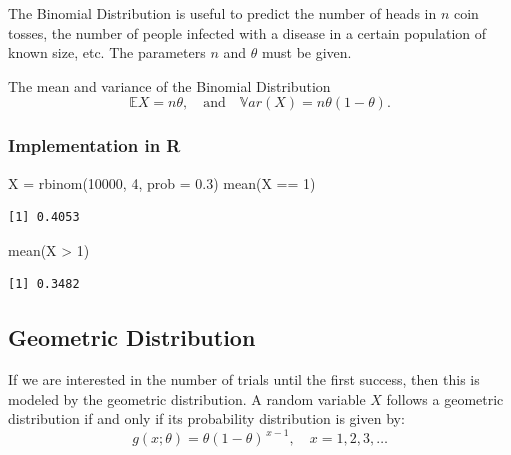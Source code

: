 \documentclass[
  letterpaper,
  DIV=11,
  numbers=noendperiod]{scrreprt}
\newenvironment{Shaded}{\begin{snugshade}}{\end{snugshade}}
\newcommand{\AttributeTok}[1]{\textcolor[rgb]{0.40,0.45,0.13}{#1}}
\newcommand{\DecValTok}[1]{\textcolor[rgb]{0.68,0.00,0.00}{#1}}
\newcommand{\FloatTok}[1]{\textcolor[rgb]{0.68,0.00,0.00}{#1}}
\newcommand{\FunctionTok}[1]{\textcolor[rgb]{0.28,0.35,0.67}{#1}}
\newcommand{\NormalTok}[1]{\textcolor[rgb]{0.00,0.23,0.31}{#1}}
\newcommand{\OtherTok}[1]{\textcolor[rgb]{0.00,0.23,0.31}{#1}}
\newcommand{\SpecialCharTok}[1]{\textcolor[rgb]{0.37,0.37,0.37}{#1}}
\begin{document}
The Binomial Distribution is useful to predict the number of heads in
\(n\) coin tosses, the number of people infected with a disease in a
certain population of known size, etc. The parameters \(n\) and
\(\theta\) must be given.

The mean and variance of the Binomial Distribution \[
\mathbb{E}X = n\theta,\quad \text{and}\quad \mathbb{V}ar(X) = n\theta(1-\theta).\]

\subsubsection{Implementation in R}\label{implementation-in-r-2}

\begin{Shaded}
\begin{Highlighting}[]
\NormalTok{X }\OtherTok{=} \FunctionTok{rbinom}\NormalTok{(}\DecValTok{10000}\NormalTok{, }\DecValTok{4}\NormalTok{, }\AttributeTok{prob =} \FloatTok{0.3}\NormalTok{)}
\FunctionTok{mean}\NormalTok{(X }\SpecialCharTok{==} \DecValTok{1}\NormalTok{)}
\end{Highlighting}
\end{Shaded}

\begin{verbatim}
[1] 0.4053
\end{verbatim}

\begin{Shaded}
\begin{Highlighting}[]
\FunctionTok{mean}\NormalTok{(X }\SpecialCharTok{\textgreater{}} \DecValTok{1}\NormalTok{)}
\end{Highlighting}
\end{Shaded}

\begin{verbatim}
[1] 0.3482
\end{verbatim}

\subsection{Geometric Distribution}\label{geometric-distribution}

If we are interested in the number of trials until the first success,
then this is modeled by the geometric distribution. A random variable
\(X\) follows a geometric distribution if and only if its probability
distribution is given by: \[
g(x;\theta) = \theta (1 - \theta)^{\,x-1}, \quad x = 1,2,3,\ldots
\]
\end{document}
